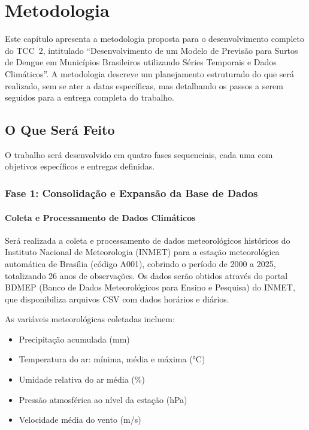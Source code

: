 \chapter{Metodologia}
\label{cap:metodologia}

Este capítulo apresenta a metodologia proposta para o desenvolvimento completo do TCC~2, intitulado ``Desenvolvimento de um Modelo de Previsão para Surtos de Dengue em Municípios Brasileiros utilizando Séries Temporais e Dados Climáticos''. A metodologia descreve um planejamento estruturado do que será realizado, sem se ater a datas específicas, mas detalhando os passos a serem seguidos para a entrega completa do trabalho.

\section{O Que Será Feito}

O trabalho será desenvolvido em quatro fases sequenciais, cada uma com objetivos específicos e entregas definidas.

\subsection{Fase 1: Consolidação e Expansão da Base de Dados}

\subsubsection{Coleta e Processamento de Dados Climáticos}

Será realizada a coleta e processamento de dados meteorológicos históricos do Instituto Nacional de Meteorologia (INMET) para a estação meteorológica automática de Brasília (código A001), cobrindo o período de 2000 a 2025, totalizando 26 anos de observações. Os dados serão obtidos através do portal BDMEP (Banco de Dados Meteorológicos para Ensino e Pesquisa) do INMET, que disponibiliza arquivos CSV com dados horários e diários.

As variáveis meteorológicas coletadas incluem:
\begin{itemize}
    \item Precipitação acumulada (mm)
    \item Temperatura do ar: mínima, média e máxima (°C)
    \item Umidade relativa do ar média (\%)
    \item Pressão atmosférica ao nível da estação (hPa)
    \item Velocidade média do vento (m/s)
\end{itemize}

